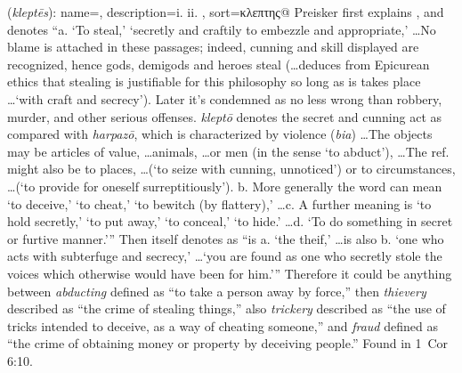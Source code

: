 \item[Fraudster,]

(\textit{kleptēs}):
{
    name=,
    description={i.  ii. },
    sort=κλεπτης@
}
Preisker first explains , and denotes ``a. `To steal,' `secretly and craftily to embezzle and appropriate,' \ldots No blame is attached in these passages; indeed, cunning and skill displayed are recognized, hence gods, demigods and heroes steal (\ldots deduces from Epicurean ethics that stealing is justifiable for this philosophy so long as is takes place \ldots `with craft and secrecy'). Later it's condemned as no less wrong than robbery, murder, and other serious offenses. \emph{kleptō} denotes the secret and cunning act as compared with \emph{harpazō}, which is characterized by violence (\emph{bia}) \ldots The objects may be articles of value, \ldots animals, \ldots or men (in the sense `to abduct'), \ldots The ref. might also be to places, \ldots (`to seize with cunning, unnoticed') or to circumstances, \ldots (`to provide for oneself surreptitiously'). b. More generally the word can mean `to deceive,' `to cheat,' `to bewitch (by flattery),' \ldots c. A further meaning is `to hold secretly,' `to put away,' `to conceal,' `to hide.' \ldots d. `To do something in secret or furtive manner.'''
Then  itself denotes as ``is a. `the theif,' \ldots is also b. `one who acts with subterfuge and secrecy,' \ldots `you are found as one who secretly stole the voices which otherwise would have been for him.'''
Therefore it could be anything between \emph{abducting} defined as ``to take a person away by force,'' then \emph{thievery} described as ``the crime of stealing things,'' also \emph{trickery} described as ``the use of tricks intended to deceive, as a way of cheating someone,'' and \emph{fraud} defined as ``the crime of obtaining money or property by deceiving people.''
Found in 1~Cor 6:10.
